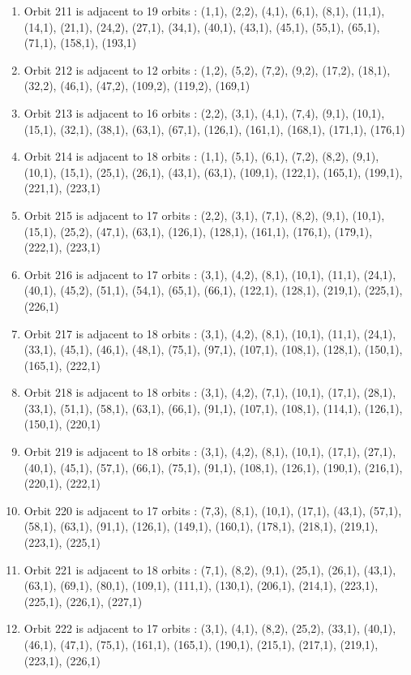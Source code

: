 \documentclass[12pt]{article}
\begin{document}
\begin{enumerate}
\item Orbit 211 is adjacent to 19 orbits : (1,1), (2,2), (4,1), (6,1), (8,1), (11,1), (14,1), (21,1), (24,2), (27,1), (34,1), (40,1), (43,1), (45,1), (55,1), (65,1), (71,1), (158,1), (193,1)
\item Orbit 212 is adjacent to 12 orbits : (1,2), (5,2), (7,2), (9,2), (17,2), (18,1), (32,2), (46,1), (47,2), (109,2), (119,2), (169,1)
\item Orbit 213 is adjacent to 16 orbits : (2,2), (3,1), (4,1), (7,4), (9,1), (10,1), (15,1), (32,1), (38,1), (63,1), (67,1), (126,1), (161,1), (168,1), (171,1), (176,1)
\item Orbit 214 is adjacent to 18 orbits : (1,1), (5,1), (6,1), (7,2), (8,2), (9,1), (10,1), (15,1), (25,1), (26,1), (43,1), (63,1), (109,1), (122,1), (165,1), (199,1), (221,1), (223,1)
\item Orbit 215 is adjacent to 17 orbits : (2,2), (3,1), (7,1), (8,2), (9,1), (10,1), (15,1), (25,2), (47,1), (63,1), (126,1), (128,1), (161,1), (176,1), (179,1), (222,1), (223,1)
\item Orbit 216 is adjacent to 17 orbits : (3,1), (4,2), (8,1), (10,1), (11,1), (24,1), (40,1), (45,2), (51,1), (54,1), (65,1), (66,1), (122,1), (128,1), (219,1), (225,1), (226,1)
\item Orbit 217 is adjacent to 18 orbits : (3,1), (4,2), (8,1), (10,1), (11,1), (24,1), (33,1), (45,1), (46,1), (48,1), (75,1), (97,1), (107,1), (108,1), (128,1), (150,1), (165,1), (222,1)
\item Orbit 218 is adjacent to 18 orbits : (3,1), (4,2), (7,1), (10,1), (17,1), (28,1), (33,1), (51,1), (58,1), (63,1), (66,1), (91,1), (107,1), (108,1), (114,1), (126,1), (150,1), (220,1)
\item Orbit 219 is adjacent to 18 orbits : (3,1), (4,2), (8,1), (10,1), (17,1), (27,1), (40,1), (45,1), (57,1), (66,1), (75,1), (91,1), (108,1), (126,1), (190,1), (216,1), (220,1), (222,1)
\item Orbit 220 is adjacent to 17 orbits : (7,3), (8,1), (10,1), (17,1), (43,1), (57,1), (58,1), (63,1), (91,1), (126,1), (149,1), (160,1), (178,1), (218,1), (219,1), (223,1), (225,1)
\item Orbit 221 is adjacent to 18 orbits : (7,1), (8,2), (9,1), (25,1), (26,1), (43,1), (63,1), (69,1), (80,1), (109,1), (111,1), (130,1), (206,1), (214,1), (223,1), (225,1), (226,1), (227,1)
\item Orbit 222 is adjacent to 17 orbits : (3,1), (4,1), (8,2), (25,2), (33,1), (40,1), (46,1), (47,1), (75,1), (161,1), (165,1), (190,1), (215,1), (217,1), (219,1), (223,1), (226,1)

\end{enumerate}
\end{document}
